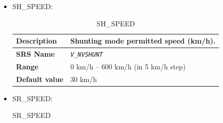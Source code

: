 \documentclass{template/openetcs}
\begin{document}
\begin{itemize}
\begin{longtable}{|l|l|}
				\hline
				
			\end{longtable}
			
			
		\item SH\_SPEED:
			\begin{longtable}{|l|l|}
				\caption{SH\_SPEED}\\ 				
				\hline
				
					\begin{minipage}[t]{0.22\linewidth} \textbf{Description}	\end{minipage} 
				&	\begin{minipage}[t]{0.78\linewidth} Shunting mode permitted speed (km/h). \end{minipage} \\
				
				\hline
				
					\begin{minipage}[t]{0.22\linewidth} \textbf{SRS Name}	\end{minipage} 
				&	\begin{minipage}[t]{0.78\linewidth} \emph{\texttt{V\_NVSHUNT}} \end{minipage} \\
				
				\hline
														
					\begin{minipage}[t]{0.22\linewidth} \textbf{Range}	\end{minipage} 
				&	\begin{minipage}[t]{0.78\linewidth} 0 km/h – 600 km/h (in 5 km/h step) \end{minipage} \\
				
				\hline
										
					\begin{minipage}[t]{0.22\linewidth} \textbf{Default value}	\end{minipage} 
				&	\begin{minipage}[t]{0.78\linewidth} 30 km/h \end{minipage} \\
				
				\hline
				
			\end{longtable}
			
			
		\item SR\_SPEED:
			\begin{longtable}{|l|l|}
				\caption{SR\_SPEED}\\ 							
				\hline
				

\end{longtable}
\end{itemize}
\end{document}
